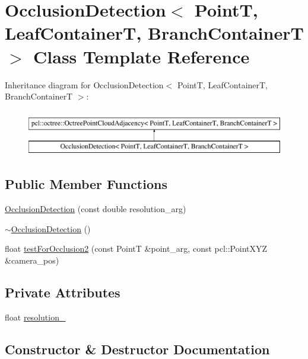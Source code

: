 \hypertarget{classOcclusionDetection}{}\section{Occlusion\+Detection$<$ PointT, Leaf\+ContainerT, Branch\+ContainerT $>$ Class Template Reference}
\label{classOcclusionDetection}
Inheritance diagram for Occlusion\+Detection$<$ PointT, Leaf\+ContainerT, Branch\+ContainerT $>$\+:\begin{figure}[H]
\begin{center}
\leavevmode
\includegraphics[height=2.000000cm]{classOcclusionDetection}
\end{center}
\end{figure}
\subsection*{Public Member Functions}
\begin{DoxyCompactItemize}
\item 
\hyperlink{classOcclusionDetection_acc151a65df0a4c19941c8af11c499deb}{Occlusion\+Detection} (const double resolution\+\_\+arg)
\item 
\hyperlink{classOcclusionDetection_ae4b87aa0e0cd1806dab5ceebf8eb1992}{$\sim$\+Occlusion\+Detection} ()
\item 
float \hyperlink{classOcclusionDetection_a7085e4d2d0e2d952f90fa366c73a12bc}{test\+For\+Occlusion2} (const PointT \&point\+\_\+arg, const pcl\+::\+Point\+X\+YZ \&camera\+\_\+pos)
\end{DoxyCompactItemize}
\subsection*{Private Attributes}
\begin{DoxyCompactItemize}
\item 
float \hyperlink{classOcclusionDetection_a1ae68b099e17672264520484de90d0c0}{resolution\+\_\+}
\end{DoxyCompactItemize}


\subsection{Constructor \& Destructor Documentation}
\mbox{\label{classOcclusionDetection_acc151a65df0a4c19941c8af11c499deb}} 

